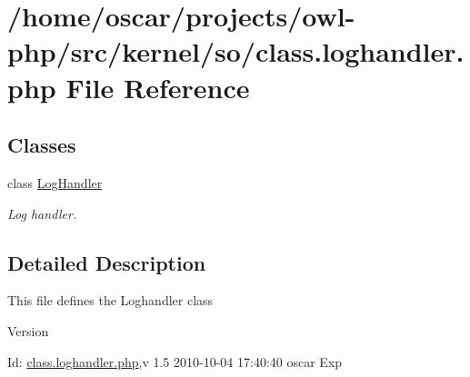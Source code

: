 \section{/home/oscar/projects/owl-\/php/src/kernel/so/class.loghandler.php File Reference}
\label{class_8loghandler_8php}
\subsection*{Classes}
\begin{DoxyCompactItemize}
\item 
class \hyperlink{classLogHandler}{LogHandler}
\begin{DoxyCompactList}\small\item\em Log handler. \item\end{DoxyCompactList}\end{DoxyCompactItemize}


\subsection{Detailed Description}
This file defines the Loghandler class \begin{DoxyVersion}{Version}

\end{DoxyVersion}
\begin{DoxyParagraph}{Id:}
\hyperlink{class_8loghandler_8php}{class.loghandler.php},v 1.5 2010-\/10-\/04 17:40:40 oscar Exp 
\end{DoxyParagraph}
